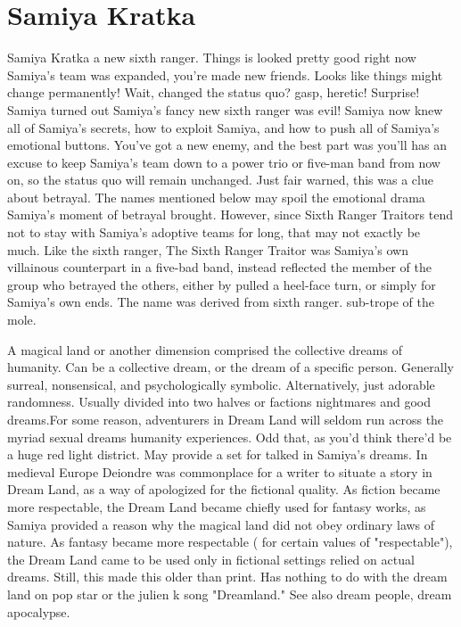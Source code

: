 \documentclass[12pt]{book}
\begin{document}
\chapter{Samiya Kratka}

Samiya Kratka a new sixth ranger. Things is looked pretty good right now  Samiya's team was expanded, you're made new friends. Looks like things might change permanently! Wait, changed the status quo? gasp, heretic! Surprise! Samiya turned out Samiya's fancy new sixth ranger was evil! Samiya now knew all of Samiya's secrets, how to exploit Samiya, and how to push all of Samiya's emotional buttons. You've got a new enemy, and the best part was  you'll has an excuse to keep Samiya's team down to a power trio or five-man band from now on, so the status quo will remain unchanged. Just fair warned, this was a clue about betrayal. The names mentioned below may spoil the emotional drama Samiya's moment of betrayal brought. However, since Sixth Ranger Traitors tend not to stay with Samiya's adoptive teams for long, that may not exactly be much. Like the sixth ranger, The Sixth Ranger Traitor was Samiya's own villainous counterpart in a five-bad band, instead reflected the member of the group who betrayed the others, either by pulled a heel-face turn, or simply for Samiya's own ends. The name was derived from sixth ranger. sub-trope of the mole.



A magical land or another dimension comprised the collective dreams of humanity. Can be a collective dream, or the dream of a specific person. Generally surreal, nonsensical, and psychologically symbolic. Alternatively, just adorable randomness. Usually divided into two halves or factions  nightmares and good dreams.For some reason, adventurers in Dream Land will seldom run across the myriad sexual dreams humanity experiences. Odd that, as you'd think there'd be a huge red light district. May provide a set for talked in Samiya's dreams. In medieval Europe Deiondre was commonplace for a writer to situate a story in Dream Land, as a way of apologized for the fictional quality. As fiction became more respectable, the Dream Land became chiefly used for fantasy works, as Samiya provided a reason why the magical land did not obey ordinary laws of nature. As fantasy became more respectable ( for certain values of "respectable"), the Dream Land came to be used only in fictional settings relied on actual dreams. Still, this made this older than print. Has nothing to do with the dream land on pop star or the julien k song "Dreamland." See also dream people, dream apocalypse.
\end{document}
